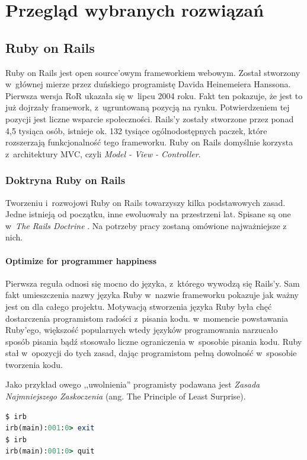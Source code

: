 \chapter{Przegląd wybranych rozwiązań}
\section{Ruby on Rails}
Ruby on Rails jest open source'owym frameworkiem webowym. Został stworzony w~głównej mierze przez duńskiego programistę Davida Heinemeiera Hanssona. Pierwsza wersja RoR ukazała się w~lipcu 2004 roku. Fakt ten pokazuje, że jest to już dojrzały framework, z~ugruntowaną pozycją na rynku. Potwierdzeniem tej pozycji jest liczne wsparcie społeczności. Rails'y zostały stworzone przez ponad 4,5 tysiąca osób, istnieje ok. 132 tysiące ogólnodostępnych paczek, które rozszerzają funkcjonalność tego frameworku. Ruby on Rails domyślnie korzysta z~architektury MVC, czyli \emph{Model - View - Controller}.

\subsection{Doktryna Ruby on Rails}
Tworzeniu i~rozwojowi Ruby on Rails towarzyszy kilka podstawowych zasad. Jedne istnieją od początku, inne ewoluowały na przestrzeni lat. Spisane są one w~\emph{The Rails Doctrine} \cite{rails_doctrine}. Na potrzeby pracy zostaną omówione najważniejsze z nich.

\subsubsection{Optimize for programmer happiness}
Pierwsza reguła odnosi się mocno do języka, z~którego wywodzą się Rails'y. Sam fakt umieszczenia nazwy języka Ruby w~nazwie frameworku pokazuje jak ważny jest on dla całego projektu. Motywacją stworzenia języka Ruby była chęć dostarczenia programistom radości z~pisania kodu. w~momencie powstawania Ruby'ego, większość popularnych wtedy języków programowania narzucało sposób pisania bądź stosowało liczne ograniczenia w~sposobie pisania kodu. Ruby stał w~opozycji do tych zasad, dając programistom pełną dowolność w~sposobie tworzenia kodu.

Jako przykład owego ,,uwolnienia'' programisty podawana jest \emph{Zasada Najmniejszego Zaskoczenia} (ang. The Principle of Least Surprise).
\begin{lstlisting}[caption={Wyjście z~interpretera Ruby'ego.},language=Ruby]
$ irb
irb(main):001:0> exit
$ irb
irb(main):001:0> quit
\end{lstlisting}

